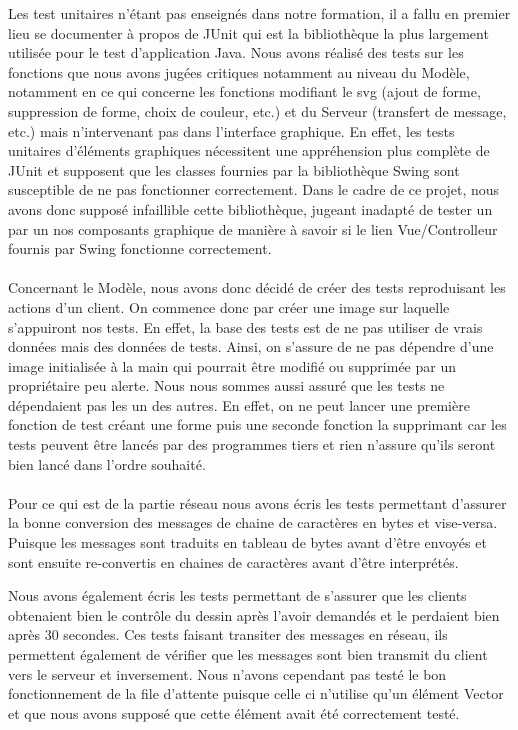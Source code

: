 \documentclass[a4paper,11pt]{article}
\begin{document}
Les test unitaires n'\'etant pas enseign\'es dans notre formation, il a fallu en premier lieu se documenter \`a propos de JUnit qui est la bibliothèque la plus largement utilisée pour le test d'application Java. Nous avons r\'ealis\'e des tests sur les fonctions que nous avons jugées critiques notamment au niveau du Modèle, notamment en ce qui concerne les fonctions modifiant le svg (ajout de forme, suppression de forme, choix de couleur, etc.) et du Serveur (transfert de message, etc.)  mais n'intervenant pas dans l'interface graphique. En effet, les tests unitaires d'\'el\'ements graphiques n\'ecessitent une appr\'ehension plus compl\`ete de JUnit et supposent que les classes fournies par la biblioth\`eque Swing sont susceptible de ne pas fonctionner correctement. Dans le cadre de ce projet, nous avons donc suppos\'e infaillible cette biblioth\`eque, jugeant inadapté de tester un par un nos composants graphique de manière à savoir si le lien Vue/Controlleur fournis par Swing fonctionne correctement.

\paragraph{} Concernant le Modèle, nous avons donc décidé de créer des tests reproduisant les actions d'un client. On commence donc par créer une image sur laquelle s'appuiront nos tests. En effet, la base des tests est de ne pas utiliser de vrais données mais des données de tests. Ainsi, on s'assure de ne pas dépendre d'une image initialisée à la main qui pourrait être modifié ou supprimée par un propriétaire peu alerte. Nous nous sommes aussi assuré que les tests ne dépendaient pas les un des autres. En effet, on ne peut lancer une première fonction de test créant une forme puis une seconde fonction la supprimant car les tests peuvent être lancés par des programmes tiers et rien n'assure qu'ils seront bien lancé dans l'ordre souhaité.

\paragraph{} Pour ce qui est de la partie réseau nous avons écris les tests permettant d'assurer la bonne conversion des messages de chaine de caractères en bytes et vise-versa. Puisque les messages sont traduits en tableau de bytes avant d'être envoyés et sont ensuite re-convertis en chaines de caractères avant d'être interprétés.

Nous avons également écris les tests permettant de s'assurer que les clients obtenaient bien le contrôle du dessin après l'avoir demandés et le perdaient bien après 30 secondes. Ces tests faisant transiter des messages en réseau, ils permettent également de vérifier que les messages sont bien transmit du client vers le serveur et inversement.
Nous n'avons cependant pas testé le bon fonctionnement de la file d'attente puisque celle ci n'utilise qu'un élément Vector et que nous avons supposé que cette élément avait été correctement testé.
\end{document}

